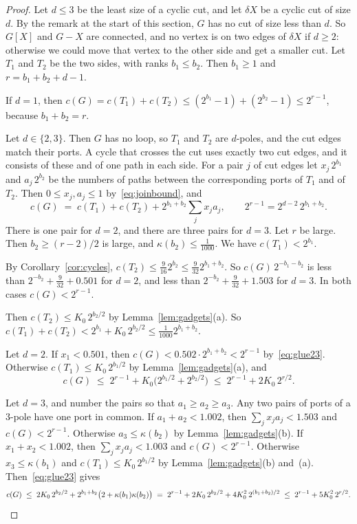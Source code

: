\begin{proof}
Let $d\le3$ be the least size of a cyclic cut, and let $\delta X$ be a cyclic cut of size $d$. By
the remark at the start of this section, $G$ has no cut of size less than $d$. So $G[X]$ and
$G-X$ are connected, and no vertex is on two edges of $\delta X$ if $d\ge2$: otherwise we could
move that vertex to the other side and get a smaller cut. Let $T_1$ and $T_2$ be the two sides,
with ranks $b_1\le b_2$. Then $b_1\ge1$ and $r=b_1+b_2+d-1$.

If $d=1$, then $c(G)=c(T_1)+c(T_2)\le(2^{b_1}-1)+(2^{b_2}-1)\le2^{r-1}$, because $b_1+b_2=r$.

Let $d\in\{2,3\}$. Then $G$ has no loop, so $T_1$ and $T_2$ are $d$-poles, and the cut edges
match their ports. A cycle
that crosses the cut uses exactly two cut edges, and it consists of these and of one path in each
side. For a pair $j$ of cut edges let $x_j\,2^{b_1}$ and $a_j\,2^{b_2}$ be the numbers of paths
between the corresponding ports of $T_1$ and of $T_2$. Then $0\le x_j,a_j\le1$
by~\eqref{eq:joinbound}, and
\begin{equation}\label{eq:glue23}
  c(G)\;=\;c(T_1)+c(T_2)+2^{b_1+b_2}\sum_jx_ja_j,
  \qquad 2^{r-1}=2^{d-2}\,2^{b_1+b_2}.
\end{equation}
There is one pair for $d=2$, and there are three pairs for $d=3$. Let $r$ be large. Then
$b_2\ge(r-2)/2$ is large, and $\kappa(b_2)\le\frac1{1000}$. We have $c(T_1)<2^{b_1}$.

 By Corollary~\ref{cor:cycles},
$c(T_2)\le\frac9{16}2^{b_2}\le\frac9{32}2^{b_1+b_2}$. So $c(G)\,2^{-b_1-b_2}$ is less than
$2^{-b_2}+\frac9{32}+0.501$ for $d=2$, and less than $2^{-b_2}+\frac9{32}+1.503$ for $d=3$. In
both cases $c(G)<2^{r-1}$.

 Then $c(T_2)\le K_0\,2^{b_2/2}$ by
Lemma~\ref{lem:gadgets}(a). So $c(T_1)+c(T_2)<2^{b_1}+K_0\,2^{b_2/2}\le\frac1{1000}2^{b_1+b_2}$.

Let $d=2$. If $x_1<0.501$, then $c(G)<0.502\cdot2^{b_1+b_2}<2^{r-1}$ by~\eqref{eq:glue23}.
Otherwise $c(T_1)\le K_0\,2^{b_1/2}$ by Lemma~\ref{lem:gadgets}(a), and
\[
  c(G)\;\le\;2^{r-1}+K_0\bigl(2^{b_1/2}+2^{b_2/2}\bigr)\;\le\;2^{r-1}+2K_0\,2^{r/2}.
\]

Let $d=3$, and number the pairs so that $a_1\ge a_2\ge a_3$. Any two pairs of ports of a $3$-pole
have one port in common. If $a_1+a_2<1.002$, then $\sum_jx_ja_j<1.503$ and $c(G)<2^{r-1}$.
Otherwise $a_3\le\kappa(b_2)$ by Lemma~\ref{lem:gadgets}(b). If $x_1+x_2<1.002$, then
$\sum_jx_ja_j<1.003$ and $c(G)<2^{r-1}$. Otherwise $x_3\le\kappa(b_1)$ and
$c(T_1)\le K_0\,2^{b_1/2}$ by Lemma~\ref{lem:gadgets}(b) and~(a). Then~\eqref{eq:glue23} gives
\[
  c(G)\;\le\;2K_0\,2^{b_2/2}+2^{b_1+b_2}\bigl(2+\kappa(b_1)\kappa(b_2)\bigr)
  \;=\;2^{r-1}+2K_0\,2^{b_2/2}+4K_0^{2}\,2^{(b_1+b_2)/2}
  \;\le\;2^{r-1}+5K_0^{2}\,2^{r/2}.\qedhere
\]
\end{proof}

